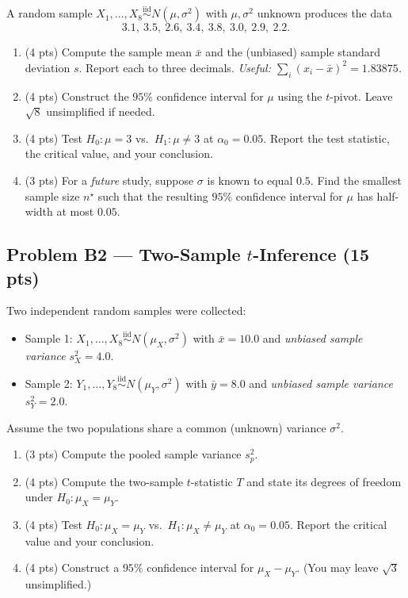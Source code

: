\documentclass[11pt]{article}
\newcommand{\iid}{\stackrel{\text{iid}}{\sim}}
\begin{document}
A random sample $X_1, \dots, X_8 \iid N(\mu, \sigma^2)$ with $\mu, \sigma^2$ unknown produces the data
\[
3.1,\ 3.5,\ 2.6,\ 3.4,\ 3.8,\ 3.0,\ 2.9,\ 2.2.
\]

\begin{enumerate}[label=(\alph*),leftmargin=2em]
    \item (4 pts) Compute the sample mean $\bar{x}$ and the (unbiased) sample standard deviation $s$. Report each to three decimals. \emph{Useful: $\sum_i (x_i - \bar{x})^2 = 1.83875$.}
    \item (4 pts) Construct the $95\%$ confidence interval for $\mu$ using the $t$-pivot. Leave $\sqrt{8}$ unsimplified if needed.
    \item (4 pts) Test $H_0: \mu = 3$ vs.\ $H_1: \mu \ne 3$ at $\alpha_0 = 0.05$. Report the test statistic, the critical value, and your conclusion.
    \item (3 pts) For a \emph{future} study, suppose $\sigma$ is known to equal $0.5$. Find the smallest sample size $n^\star$ such that the resulting $95\%$ confidence interval for $\mu$ has half-width at most $0.05$.
\end{enumerate}

\subsection*{Problem B2 --- Two-Sample $t$-Inference (15 pts)}

Two independent random samples were collected:
\begin{itemize}[leftmargin=*, itemsep=0pt]
    \item Sample 1: $X_1, \dots, X_8 \iid N(\mu_X, \sigma^2)$ with $\bar{x} = 10.0$ and \emph{unbiased sample variance} $s_X^2 = 4.0$.
    \item Sample 2: $Y_1, \dots, Y_8 \iid N(\mu_Y, \sigma^2)$ with $\bar{y} = 8.0$ and \emph{unbiased sample variance} $s_Y^2 = 2.0$.
\end{itemize}
Assume the two populations share a common (unknown) variance $\sigma^2$.

\begin{enumerate}[label=(\alph*),leftmargin=2em]
    \item (3 pts) Compute the pooled sample variance $s_p^2$.
    \item (4 pts) Compute the two-sample $t$-statistic $T$ and state its degrees of freedom under $H_0: \mu_X = \mu_Y$.
    \item (4 pts) Test $H_0: \mu_X = \mu_Y$ vs.\ $H_1: \mu_X \ne \mu_Y$ at $\alpha_0 = 0.05$. Report the critical value and your conclusion.
    \item (4 pts) Construct a $95\%$ confidence interval for $\mu_X - \mu_Y$. (You may leave $\sqrt{3}$ unsimplified.)
\end{enumerate}
\end{document}
